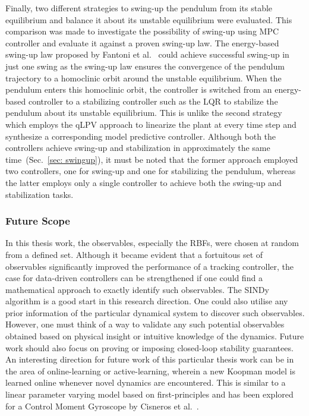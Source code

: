 Finally, two different strategies to swing-up the pendulum from its stable equilibrium and balance it about its unstable equilibrium were evaluated. This comparison was made to investigate the possibility of swing-up using MPC controller and evaluate it against a proven swing-up law. The energy-based swing-up law proposed by Fantoni et al.~\cite{Fantoni} could achieve successful swing-up in just one swing as the swing-up law ensures the convergence of the pendulum trajectory to a homoclinic orbit around the unstable equilibrium. When the pendulum enters this homoclinic orbit, the controller is switched from an energy-based controller to a stabilizing controller such as the LQR to stabilize the pendulum about its unstable equilibrium. This is unlike the second strategy which employs the qLPV approach to linearize the plant at every time step and synthesize a corresponding model predictive controller. Although both the controllers achieve swing-up and stabilization in approximately the same time~(Sec.~\ref{sec: swingup}), it must be noted that the former approach employed two controllers, one for swing-up and one for stabilizing the pendulum, whereas the latter employs only a single controller to achieve both the swing-up and stabilization tasks.
\newpage
\subsubsection*{Future Scope}
In this thesis work, the observables, especially the RBFs, were chosen at random from a defined set. Although it became evident that a fortuitous set of observables significantly improved the performance of a tracking controller, the case for data-driven controllers can be strengthened if one could find a mathematical approach to exactly identify such observables. The SINDy algorithm is a good start in this research direction. One could also utilise any prior information of the particular dynamical system to discover such observables. However, one must think of a way to validate any such potential observables obtained based on physical insight or intuitive knowledge of the dynamics. Future work should also focus on proving or imposing closed-loop stability guarantees. An interesting direction for future work of this particular thesis work can be in the area of online-learning or active-learning, wherein a new Koopman model is learned online whenever novel dynamics are encountered. This is similar to a linear parameter varying model based on first-principles and has been explored for a Control Moment Gyroscope by Cisneros et al.~\cite{Cisneros.2020}.